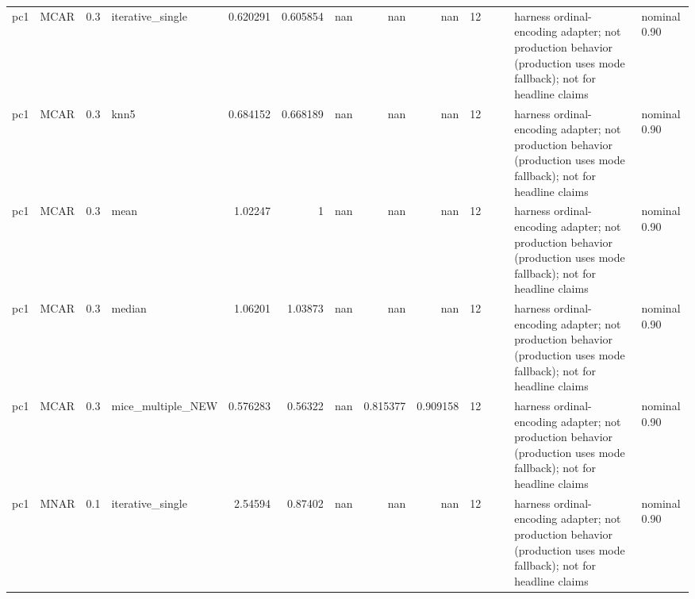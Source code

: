 \begin{table}[ht]
\begin{tabular}{llrlrrrrrrllll}
 pc1                  & MCAR        &         0.3 & iterative\_single  &       0.620291 &             0.605854 &               nan        &                     nan        &                       nan        &        12 &                    &                                         & harness ordinal-encoding adapter; not production behavior (production uses mode fallback); not for headline claims & nominal 0.90              \\
 pc1                  & MCAR        &         0.3 & knn5              &       0.684152 &             0.668189 &               nan        &                     nan        &                       nan        &        12 &                    &                                         & harness ordinal-encoding adapter; not production behavior (production uses mode fallback); not for headline claims & nominal 0.90              \\
 pc1                  & MCAR        &         0.3 & mean              &       1.02247  &             1        &               nan        &                     nan        &                       nan        &        12 &                    &                                         & harness ordinal-encoding adapter; not production behavior (production uses mode fallback); not for headline claims & nominal 0.90              \\
 pc1                  & MCAR        &         0.3 & median            &       1.06201  &             1.03873  &               nan        &                     nan        &                       nan        &        12 &                    &                                         & harness ordinal-encoding adapter; not production behavior (production uses mode fallback); not for headline claims & nominal 0.90              \\
 pc1                  & MCAR        &         0.3 & mice\_multiple\_NEW &       0.576283 &             0.56322  &               nan        &                       0.815377 &                         0.909158 &        12 &                    &                                         & harness ordinal-encoding adapter; not production behavior (production uses mode fallback); not for headline claims & nominal 0.90              \\
 pc1                  & MNAR        &         0.1 & iterative\_single  &       2.54594  &             0.87402  &               nan        &                     nan        &                       nan        &        12 &                    &                                         & harness ordinal-encoding adapter; not production behavior (production uses mode fallback); not for headline claims & nominal 0.90              \\

\end{tabular}
\end{table}
